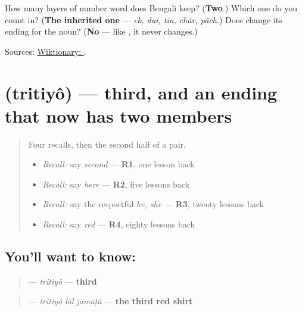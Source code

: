 \begin{tcolorbox}[breakable,colback=teal!4,colframe=teal!35!black,title={Before you move on}]
How many layers of number word does Bengali keep? (\textbf{Two}.) Which one do you count in? (\textbf{The inherited one} — \emph{ek, dui, tin, chār, pā̃ch}.) Does \textbf{} change its ending for the noun? (\textbf{No} — like \textbf{}, it never changes.)

Sources: \href{https://en.wiktionary.org/wiki/\%E0\%A6\%A6\%E0\%A7\%8D\%E0\%A6\%AC\%E0\%A6\%BF\%E0\%A6\%A4\%E0\%A7\%80\%E0\%A7\%9F}{Wiktionary: }.
\end{tcolorbox}
\section[\texorpdfstring{\bn{তৃতীয়} (tritiyô)}{তৃতীয় (tritiyô)}]{ (tritiyô) — third, and an ending that now has two members}

\label{lesson:BN-C27-tritiyo}



\begin{quote}
Four recalls, then the second half of a pair.

\begin{itemize}
\raggedright
  \item \emph{Recall:} say \emph{second} — \textbf{R1}, one lesson back
  \item \emph{Recall:} say \emph{here} — \textbf{R2}, five lessons back
  \item \emph{Recall:} say the respectful \emph{he, she} — \textbf{R3}, twenty lessons back
  \item \emph{Recall:} say \emph{red} — \textbf{R4}, eighty lessons back
\end{itemize}
\end{quote}

\subsection*{You'll want to know: }
\begin{quote}
\textbf{} — \emph{tritiyô} — \textbf{third}
\end{quote}

\begin{quote}
\textbf{  } — \emph{tritiyô lāl jāmāṭā} — \textbf{the third red shirt}
\end{quote}

